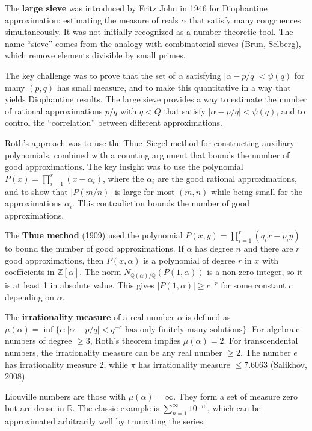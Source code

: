 The \textbf{large sieve} was introduced by Fritz John in 1946 for Diophantine
approximation: estimating the measure of reals $\alpha$ that satisfy many
congruences simultaneously. It was not initially recognized as a
number-theoretic tool. The name ``sieve'' comes from the analogy with
combinatorial sieves (Brun, Selberg), which remove elements divisible by small
primes.

The key challenge was to prove that the set of $\alpha$ satisfying $|\alpha -
p/q| < \psi(q)$ for many $(p,q)$ has small measure, and to make this
quantitative in a way that yields Diophantine results. The large sieve provides
a way to estimate the number of rational approximations $p/q$ with $q < Q$
that satisfy $|\alpha - p/q| < \psi(q)$, and to control the ``correlation''
between different approximations.

Roth's approach was to use the Thue--Siegel method for constructing auxiliary
polynomials, combined with a counting argument that bounds the number of good
approximations. The key insight was to use the polynomial $P(x) = \prod_{i=1}^r
(x - \alpha_i)$, where the $\alpha_i$ are the good rational approximations,
and to show that $|P(m/n)|$ is large for most $(m,n)$ while being small for
the approximations $\alpha_i$. This contradiction bounds the number of good
approximations.

The \textbf{Thue method} (1909) used the polynomial $P(x,y) = \prod_{i=1}^r
(q_i x - p_i y)$ to bound the number of good approximations. If $\alpha$ has
degree $n$ and there are $r$ good approximations, then $P(x, \alpha)$ is a
polynomial of degree $r$ in $x$ with coefficients in $\mathbb{Z}[\alpha]$. The
norm $N_{\mathbb{Q}(\alpha)/\mathbb{Q}}(P(1, \alpha))$ is a non-zero integer,
so it is at least 1 in absolute value. This gives $|P(1, \alpha)| \geq
c^{-r}$ for some constant $c$ depending on $\alpha$.

The \textbf{irrationality measure} of a real number $\alpha$ is defined as
$\mu(\alpha) = \inf\{c : |\alpha - p/q| < q^{-c} \text{ has only finitely
many solutions}\}$. For algebraic numbers of degree $\geq 3$, Roth's theorem
implies $\mu(\alpha) = 2$. For transcendental numbers, the irrationality
measure can be any real number $\geq 2$. The number $e$ has irrationality
measure 2, while $\pi$ has irrationality measure $\leq 7.6063$ (Salikhov,
2008).

Liouville numbers are those with $\mu(\alpha) = \infty$. They form a set of
measure zero but are dense in $\mathbb{R}$. The classic example is
$\sum_{n=1}^{\infty} 10^{-n!}$, which can be approximated arbitrarily well by
truncating the series.

